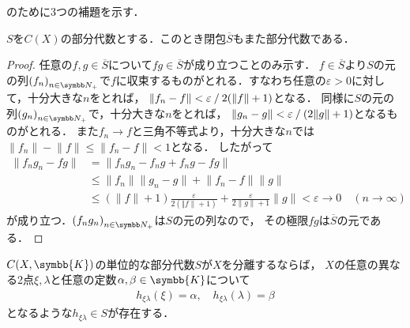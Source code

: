 \documentclass[../main.tex]{subfiles}
\begin{document}
のために3つの補題を示す．

\begin{thmbox}
\begin{lemma}
\(S\)を\(C(X)\)の部分代数とする．このとき閉包\(\overline{S}\)もまた部分代数である．
\end{lemma}
\end{thmbox}

\begin{proof}
任意の\(f, g \in \overline{S}\)について\(f g \in \overline{S}\)が成り立つことのみ示す．
\(f \in \overline{S}\)より\(S\)の元の列\({(f_n)}_{n \in \PositiveInteger}\)で\(f\)に収束するものがとれる．すなわち任意の\(\varepsilon > 0\)に対して，十分大きな\(n\)をとれば，
\(\lVert f_n - f \rVert < \varepsilon\mathbin{/}2( \lVert f \rVert + 1)\)となる．
同様に\(S\)の元の列\({(g_n)}_{n \in \PositiveInteger}\)で，十分大きな\(n\)をとれば，
\(\lVert g_n - g \rVert < \varepsilon\mathbin{/}(2 \lVert g \rVert + 1)\)となるものがとれる．
また\(f_n \to f\)と三角不等式より，十分大きな\(n\)では\(\lVert f_n \rVert - \lVert f \rVert \leq \lVert f_n - f \rVert < 1\)となる．
したがって
\begin{align*}
    \lVert f_n g_n - fg \rVert
    &= \lVert f_n g_n - f_n g + f_n g - fg \rVert \\
    &\leq \lVert f_n \rVert \lVert g_n - g \rVert + \lVert f_n - f \rVert \lVert g \rVert \\
    &\leq (\lVert f \rVert + 1) \frac{\varepsilon}{2 (\Vert f \rVert + 1)} + \frac{\varepsilon}{2 \lVert g \rVert + 1} \lVert g \rVert < \varepsilon \to 0 \quad(n \to \infty)
\end{align*}
が成り立つ．\({(f_n g_n)}_{n \in \PositiveInteger}\)は\(S\)の元の列なので，
その極限\(fg\)は\(\overline{S}\)の元である．
\end{proof}

\begin{thmbox}
\begin{lemma}
\(C(X, \symbb{K})\)の単位的な部分代数\(S\)が\(X\)を分離するならば，
\(X\)の任意の異なる2点\(\xi, \lambda\)と任意の定数\(\alpha, \beta \in \symbb{K}\)について
\begin{align*}
    h_{\xi\lambda}(\xi) = \alpha,\quad h_{\xi\lambda}(\lambda) = \beta
\end{align*}
となるような\(h_{\xi\lambda} \in S\)が存在する．
\end{lemma}
\end{thmbox}
\end{document}
